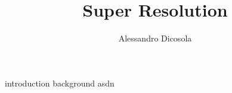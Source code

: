 \documentclass{article}
\author{Alessandro Dicosola}
\title{Super Resolution}
\begin{document}
\maketitle
\tableofcontents

{introduction}
{background}
{asdn}

\clearpage


\end{document}
